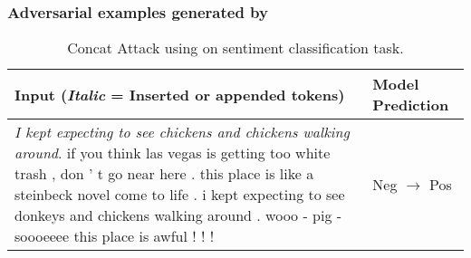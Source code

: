 \subsubsection{Adversarial examples generated by \advcodecsent}
\begin{table*}[htpb!]\small \setlength{\tabcolsep}{7pt}
\centering
\caption{Concat Attack using \advcodecsent on sentiment classification task. 
}
 \label{ctreeexamples}
\begin{tabular}{p{10.5cm}p{2.3cm}}
\toprule Input (\textit{Italic} = Inserted or appended tokens) & Model Prediction \\
\midrule
\textit{I kept expecting to see chickens and chickens walking around}. if you think las vegas is getting too white trash , don ' t go near here . this place is like a steinbeck novel come to life . i kept expecting to see donkeys and chickens walking around . wooo - pig - soooeeee this place is awful ! ! !
&  Neg  $\rightarrow$ Pos  \\ \hline

\end{tabular}
\end{table*}
